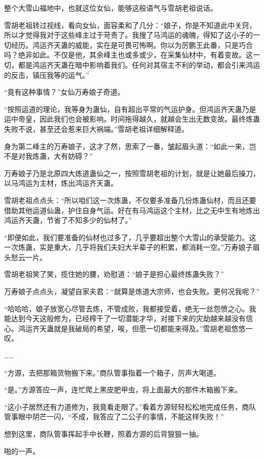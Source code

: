 \begin{this_body}
整个大雪山福地中，也就这位女仙，能够这般语气与雪胡老祖说话。

雪胡老祖转过视线，看向女仙，面容柔和了几分：“娘子，你是不知道此中关窍，所以才觉得我对于这些峰主过于苛责了。我搜了马鸿运的魂魄，得知了这小子的一切经历。鸿运齐天蛊的威能，实在是可畏可怖啊。你以为厉鹏王此番，只是巧合吗？绝非如此。不仅是他，其余峰主也或多或少，在采集仙材中，有着变故。这一切，都是鸿运齐天蛊在暗中影响着我们。任何对其宿主不利的举动，都会引来鸿运的反击，镇压我等的运气。”

“竟有这种事情？”女仙万寿娘子奇道。

“按照运道的理论，我等身为蛊仙，自有超出平常的气运护身。但鸿运齐天蛊乃是运中帝皇，因此我们也会被影响。时间拖得越久，就越会生出无数变故。最终炼蛊失败不说，甚至还会惹来巨大祸端。”雪胡老祖详细解释道。

身为第二峰主的万寿娘子，这才了然，思索了一番，皱起眉头道：“如此一来，岂不是对我炼蛊，大有妨碍？”

万寿娘子乃是北原四大炼道蛊仙之一，按照雪胡老祖的计划，就是让她最后操刀，以马鸿运为主材，炼出鸿运齐天蛊。

雪胡老祖点点头：“所以咱们这一次炼蛊，不仅要多准备几份炼蛊仙材，而且还要借助其他运道仙蛊，护住自身气运。好在有马鸿运这个主材，比之无中生有地炼出鸿运齐天蛊，节省了不知多少的仙材了。”

“即便如此，我们要准备的仙材也过多了，几乎要超出整个大雪山的承受能力。这一次炼蛊，实是重大，几乎将我们夫妇大半辈子的积累，都消耗一空。”万寿娘子眉头愁云一片。

雪胡老祖笑了笑，揽住她的腰，劝慰道：“娘子是担心最终炼蛊失败？”

万寿娘子点点头，凝望自家夫君：“就算是炼道大宗师，也会失败。更何况我呢？”

“哈哈哈，娘子放宽心尽管去炼，不管成败，我都接受着，绝无一丝怨愤之心。我能达到今天这般修为，已经榨干了一切潜能才华，对接下来的灾劫越来越没有信心。鸿运齐天蛊就是我破局的希望，唉，但愿一切都能来得及。”雪胡老祖悠悠一叹。

……

“方源，去把那箱货物搬下来。”商队管事指着一个箱子，厉声大喝道。

“是。”方源答应一声，连忙爬上黑皮肥甲虫，将上面最大的那件木箱搬下来。

“这小子居然还有力道修为，我竟看走眼了。”看着方源轻轻松松地完成任务，商队管事眼中阴芒一闪，“不成，我答应了二公子的事情，不能这样失败！”

想到这里，商队管事挥起手中长鞭，照着方源的后背狠狠一抽。

啪的一声。


\end{this_body}
